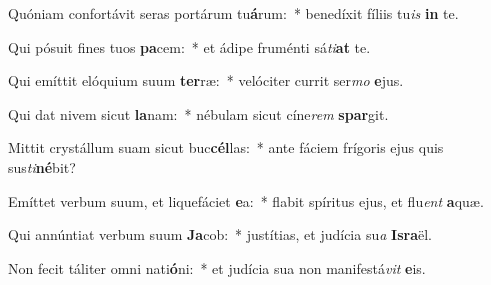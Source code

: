 \item Quóniam confortávit seras portárum tu\textbf{á}rum:~* benedíxit fíliis tu\textit{is} \textbf{in} te.
\item Qui pósuit fines tuos \textbf{pa}cem:~* et ádipe fruménti sá\textit{ti}\textbf{at} te.
\item Qui emíttit elóquium suum \textbf{ter}ræ:~* velóciter currit ser\textit{mo} \textbf{e}jus.
\item Qui dat nivem sicut \textbf{la}nam:~* nébulam sicut cíne\textit{rem} \textbf{spar}git.
\item Mittit crystállum suam sicut buc\textbf{cél}las:~* ante fáciem frígoris ejus quis sus\textit{ti}\textbf{né}bit?
\item Emíttet verbum suum, et liquefáciet \textbf{e}a:~* flabit spíritus ejus, et flu\textit{ent} \textbf{a}quæ.
\item Qui annúntiat verbum suum \textbf{Ja}cob:~* justítias, et judícia su\textit{a} \textbf{Is}\textbf{ra}ël.
\item Non fecit táliter omni nati\textbf{ó}ni:~* et judícia sua non manifestá\textit{vit} \textbf{e}is.
